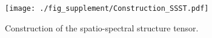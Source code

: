 \begin{figure}[t]
	\renewcommand{\thefigure}{A}
	\begin{center}
		\texttt{[image: ./fig\_supplement/Construction\_SSST.pdf]}
	\end{center}
	\caption{Construction of the spatio-spectral structure tensor. }
	\vspace{-2mm}
	\label{fig:const_SSST}
\end{figure}